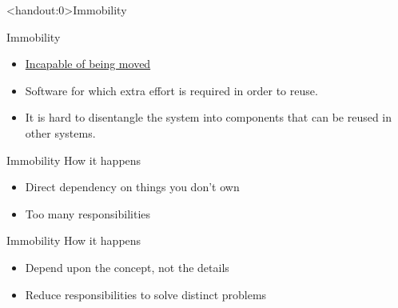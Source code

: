 \documentclass[xcolor=svgnames, handout]{beamer}
\begin{document}

{%
%
\begin{frame}<handout:0>{Immobility}
\end{frame}
}

{%
%
\begin{frame}{Immobility}

    \begin{itemize}
        \pause \item \href{https://www.merriam-webster.com/dictionary/immobile}
            {Incapable of being moved}
        \pause \item Software for which extra effort is required in order to
            reuse.
        \pause \item It is hard to disentangle the system into components that
            can be reused in other systems.
    \end{itemize}
\end{frame}
}


{%
%
\begin{frame}{Immobility}
    How it happens
    \begin{itemize}
        \item<1-> Direct dependency on things you don't own
        \item<2-> Too many responsibilities
    \end{itemize}
\end{frame}
}


{%
%
\begin{frame}{Immobility}
    How it happens
    \begin{itemize}
        \item<1-> Depend upon the concept, not the details
        \item<2-> Reduce responsibilities to solve distinct problems
    \end{itemize}
\end{frame}
}
\end{document}
